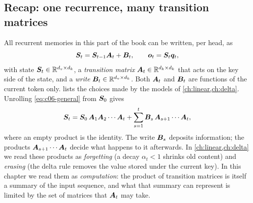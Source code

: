 \subsection{Recap: one recurrence, many transition matrices}\label{sec:c06-recap}

All recurrent memories in this part of the book can be written, per head, as
\begin{equation}\label{eq:c06-general}
  \bm{S}_t = \bm{S}_{t-1}\bm{A}_t + \bm{B}_t, \qquad \bm{o}_t = \bm{S}_t\bm{q}_t,
\end{equation}
with state $\bm{S}_t\in\mathbb{R}^{d_v\times d_k}$, a \emph{transition matrix}
$\bm{A}_t\in\mathbb{R}^{d_k\times d_k}$ that acts on the key side of the state, and a \emph{write}
$\bm{B}_t\in\mathbb{R}^{d_v\times d_k}$. Both $\bm{A}_t$ and $\bm{B}_t$ are functions of the current token
only.  lists the choices made by the models of
\cref{ch:linear,ch:delta}. Unrolling \eqref{eq:c06-general} from $\bm{S}_0$ gives
\begin{equation}\label{eq:c06-unroll}
  \bm{S}_t = \bm{S}_0\,\bm{A}_1\bm{A}_2\cdots\bm{A}_t + \sum_{s=1}^{t}\bm{B}_s\,\bm{A}_{s+1}\cdots\bm{A}_t ,
\end{equation}
where an empty product is the identity. The write $\bm{B}_s$ deposits information; the
products $\bm{A}_{s+1}\cdots\bm{A}_t$ decide what happens to it afterwards. In
\cref{ch:linear,ch:delta} we read these products as \emph{forgetting} (a decay
$\alpha_t<1$ shrinks old content) and \emph{erasing} (the delta rule removes the value
stored under the current key). In this chapter we read them as \emph{computation}: the
product of transition matrices is itself a summary of the input sequence, and what that
summary can represent is limited by the set of matrices that $\bm{A}_t$ may take.

